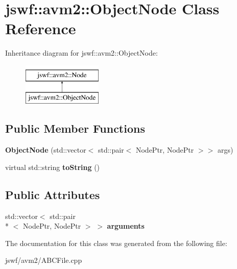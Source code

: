 \hypertarget{classjswf_1_1avm2_1_1_object_node}{\section{jswf\+:\+:avm2\+:\+:Object\+Node Class Reference}
\label{classjswf_1_1avm2_1_1_object_node}
}
Inheritance diagram for jswf\+:\+:avm2\+:\+:Object\+Node\+:\begin{figure}[H]
\begin{center}
\leavevmode
\includegraphics[height=2.000000cm]{classjswf_1_1avm2_1_1_object_node}
\end{center}
\end{figure}
\subsection*{Public Member Functions}
\begin{DoxyCompactItemize}
\item 
\hypertarget{classjswf_1_1avm2_1_1_object_node_a1ab3d782a36cc01b66730cc717e7f20f}{{\bfseries Object\+Node} (std\+::vector$<$ std\+::pair$<$ Node\+Ptr, Node\+Ptr $>$$>$ args)}\label{classjswf_1_1avm2_1_1_object_node_a1ab3d782a36cc01b66730cc717e7f20f}

\item 
\hypertarget{classjswf_1_1avm2_1_1_object_node_a779ff75cdebcb09bffd49f69413e3311}{virtual std\+::string {\bfseries to\+String} ()}\label{classjswf_1_1avm2_1_1_object_node_a779ff75cdebcb09bffd49f69413e3311}

\end{DoxyCompactItemize}
\subsection*{Public Attributes}
\begin{DoxyCompactItemize}
\item 
\hypertarget{classjswf_1_1avm2_1_1_object_node_ac05e49509d52ba86c9c1cc80e37340b4}{std\+::vector$<$ std\+::pair\\*
$<$ Node\+Ptr, Node\+Ptr $>$ $>$ {\bfseries arguments}}\label{classjswf_1_1avm2_1_1_object_node_ac05e49509d52ba86c9c1cc80e37340b4}

\end{DoxyCompactItemize}


The documentation for this class was generated from the following file\+:\begin{DoxyCompactItemize}
\item 
jswf/avm2/A\+B\+C\+File.\+cpp\end{DoxyCompactItemize}
